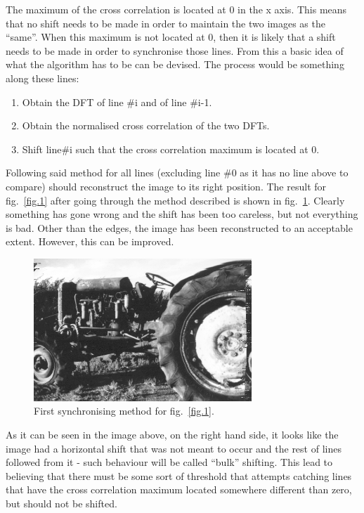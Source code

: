 \documentclass[a4paper,12pt]{article}
\begin{document}
The maximum of the cross correlation is located at 0 in the x axis. This means that no shift needs to be made in order to maintain the two images as the ``same''. When this maximum is not located at 0, then it is likely that a shift needs to be made in order to synchronise those lines. From this a basic idea of what the algorithm has to be can be devised. The process would be something along these lines: 

\begin{enumerate}
 \item Obtain the DFT of line \#i and of line \#i-1.
 \item Obtain the normalised cross correlation of the two DFTs.
 \item Shift line\#i such that the cross correlation maximum is located at 0.
\end{enumerate}

Following said method for all lines (excluding line \#0 as it has no line above to compare) should reconstruct the image to its right position. The result for fig.~\ref{fig.1} after going through the method described is shown in fig.~\ref{fig.5}. Clearly something has gone wrong and the shift has been too careless, but not everything is bad. Other than the edges, the image has been reconstructed to an acceptable extent. However, this can be improved.

\begin{figure}[h!]
\centering
\includegraphics[width=0.73\textwidth]{img/simple}
\caption{First synchronising method for fig.~\ref{fig.1}.}
\label{fig.5}
\end{figure}

As it can be seen in the image above, on the right hand side, it looks like the image had a horizontal shift that was not meant to occur and the rest of lines followed from it - such behaviour will be called ``bulk'' shifting. This lead to believing that there must be some sort of threshold that attempts catching lines that have the cross correlation maximum located somewhere different than zero, but should not be shifted. 
\end{document}
